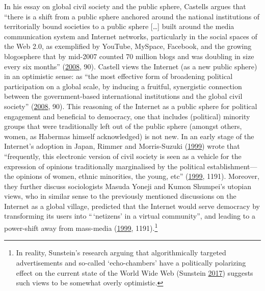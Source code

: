 \documentclass[10pt,british,A4paper,oneside]{memoir}
\begin{document}
In his essay on global civil society and the public sphere, Castells
argues that ``there is a shift from a public sphere anchored around the
national institutions of territorially bound societies to a public
sphere {[}\ldots{}{]} built around the media communication system and
Internet networks, particularly in the social spaces of the Web 2.0, as
exemplified by YouTube, MySpace, Facebook, and the growing blogosphere
that by mid-2007 counted 70 million blogs and was doubling in size every
six months'' (\protect\hyperlink{ref-castells_new_2008}{2008}, 90).
Castell views the Internet (as a new public sphere) in an optimistic
sense: as ``the most effective form of broadening political
participation on a global scale, by inducing a fruitful, synergistic
connection between the government-based international institutions and
the global civil society''
(\protect\hyperlink{ref-castells_new_2008}{2008}, 90). This reasoning of
the Internet as a public sphere for political engagement and beneficial
to democracy, one that includes (political) minority groups that were
traditionally left out of the public sphere (amongst others, women, as
Habermas himself acknowledged) is not new. In an early stage of the
Internet's adoption in Japan, Rimmer and Morris-Suzuki
(\protect\hyperlink{ref-rimmer_japanese_1999}{1999}) wrote that
``frequently, this electronic version of civil society is seen as a
vehicle for the expression of opinions traditionally marginalised by the
political establishment---the opinions of women, ethnic minorities, the
young, etc'' (\protect\hyperlink{ref-rimmer_japanese_1999}{1999}, 1191).
Moreover, they further discuss sociologists Masuda Yoneji and Kumon
Shumpei's utopian views, who in similar sense to the previously mentioned discussions on the Internet as a global village, predicted that the Internet would serve
democracy by transforming its users into ``\,`netizens' in a virtual
community'', and leading to a power-shift away from mass-media
(\protect\hyperlink{ref-rimmer_japanese_1999}{1999}, 1191).\footnote{In
  reality, Sunstein's research arguing that algorithmically targeted
  advertisements and so-called `echo-chambers' have a politically
  polarizing effect on the current state of the World Wide Web (Sunstein
  \protect\hyperlink{ref-sunstein_republic:_2017}{2017}) suggests such
  views to be somewhat overly optimistic.}
\end{document}
